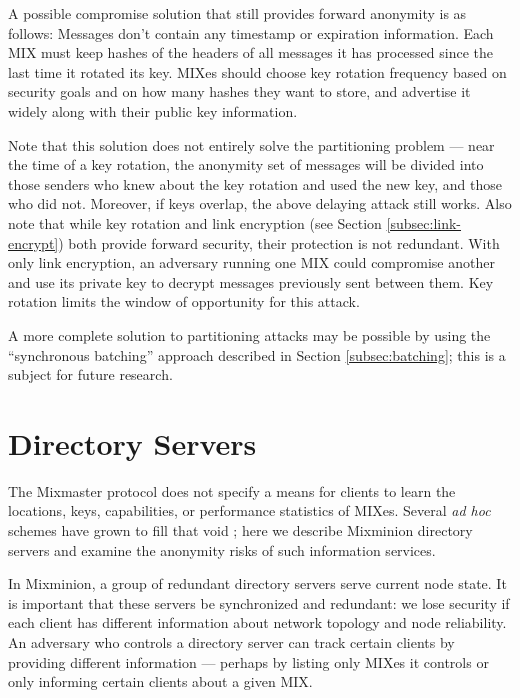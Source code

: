 \documentclass[11pt]{IEEEtran}
\begin{document}
A possible compromise solution that still provides forward anonymity
is as follows:  Messages don't
contain any timestamp or expiration information. Each MIX must keep
hashes of the headers of all messages it has processed since the last time
it rotated its key. MIXes should choose key rotation frequency based on
security goals and on how many hashes they want to store, and
advertise it widely along with their public key information.

Note that this solution does not entirely solve the partitioning problem
--- near the time of a key rotation, the anonymity set of messages will
be divided into those senders who knew about the key rotation and used
the new key, and those who did not.  Moreover, if keys overlap, the above
delaying attack still works.
Also note that while key rotation and link encryption (see Section
\ref{subsec:link-encrypt}) both provide forward security, their protection
is not redundant. With only link encryption, an adversary running
one MIX could compromise another and use its private key to decrypt
messages previously sent between them. Key rotation limits the window
of opportunity for this attack.

A more complete solution to partitioning attacks may be possible by
using the ``synchronous batching'' approach described in
Section \ref{subsec:batching}; this is a subject for future research.


\section{Directory Servers}
\label{sec:dir-servers}

The Mixmaster protocol does not specify a means for clients to learn the
locations, keys, capabilities, or performance statistics of MIXes. Several
\emph{ad hoc} schemes have grown to fill that void \cite{levien}; here
we describe Mixminion directory servers and examine the anonymity risks
of such information services.

In Mixminion, a group of redundant directory servers serve current
node state.  It is important that these servers be synchronized and
redundant:  we lose security if each client has different information
about network topology and node reliability. An adversary who controls
a directory server can track certain clients by providing different
information --- perhaps by listing only MIXes it controls or only
informing certain clients about a given MIX.
\end{document}
